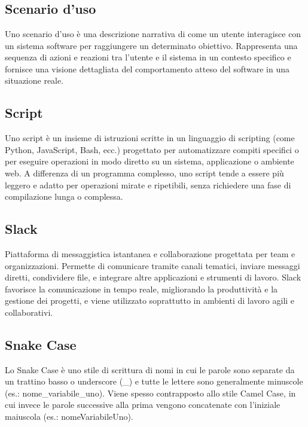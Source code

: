 
\section{}

\hypertarget{sec:scenario_uso}{}
\subsection*{Scenario d'uso}
Uno scenario d'uso è una descrizione narrativa di come un utente interagisce con un sistema software per raggiungere un determinato obiettivo. Rappresenta 
una sequenza di azioni e reazioni tra l'utente e il sistema in un contesto specifico e fornisce una visione dettagliata del comportamento atteso del software 
in una situazione reale.

\subsection*{Script}
Uno script è un insieme di istruzioni scritte in un linguaggio di scripting (come Python, JavaScript, Bash, ecc.) progettato per automatizzare compiti 
specifici o per eseguire operazioni in modo diretto su un sistema, applicazione o ambiente web. A differenza di un programma complesso, uno script tende 
a essere più leggero e adatto per operazioni mirate e ripetibili, senza richiedere una fase di compilazione lunga o complessa.

\hypertarget{sec:slack}{}
\subsection*{Slack}
Piattaforma di messaggistica istantanea e collaborazione progettata per team e organizzazioni. Permette di comunicare tramite canali tematici, inviare 
messaggi diretti, condividere file, e integrare altre applicazioni e strumenti di lavoro. Slack favorisce la comunicazione in tempo reale, migliorando 
la produttività e la gestione dei progetti, e viene utilizzato soprattutto in ambienti di lavoro agili e collaborativi.

\hypertarget{sec:snake_case}{}
\subsection*{Snake Case}
Lo Snake Case è uno stile di scrittura di nomi in cui le parole sono separate da un trattino basso o underscore (\_) e tutte le lettere sono generalmente 
minuscole (es.: nome\_variabile\_uno). Viene spesso contrapposto allo stile Camel Case, in cui invece le parole successive alla prima vengono concatenate 
con l’iniziale maiuscola (es.: nomeVariabileUno).

